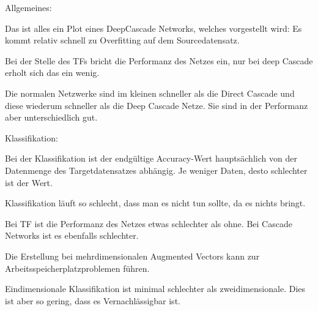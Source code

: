 Allgemeines:

Das ist alles ein Plot eines DeepCascade Networks, welches vorgestellt wird:
Es kommt relativ schnell zu Overfitting auf dem Sourcedatensatz. %

Bei der Stelle des TFs bricht die Performanz des Netzes ein, nur bei deep Cascade erholt sich das ein wenig. 


Die normalen Netzwerke sind im kleinen schneller als die Direct Cascade und diese wiederum schneller als die Deep Cascade Netze. 
Sie sind in der Performanz aber unterschiedlich gut. \newline


Klassifikation: 

Bei der Klassifikation ist der endgültige Accuracy-Wert hauptsächlich von der Datenmenge des Targetdatensatzes abhängig. 
Je weniger Daten, desto schlechter ist der Wert. %

Klassifikation läuft so schlecht, dass man es nicht tun sollte, da es nichts bringt. %

Bei TF ist die Performanz des Netzes etwas schlechter als ohne. %
Bei Cascade Networks ist es ebenfalls schlechter. %


Die Erstellung bei mehrdimensionalen Augmented Vectors kann zur Arbeitsspeicherplatzproblemen führen. %

Eindimensionale Klassifikation ist minimal schlechter als zweidimensionale. Dies ist aber so gering, dass es Vernachlässigbar ist. \newline

